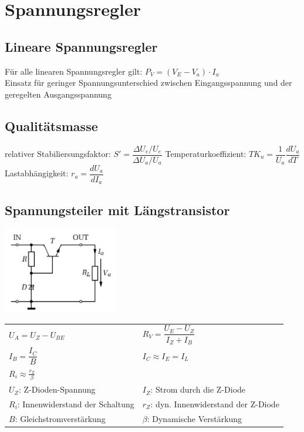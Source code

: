 \section{Spannungsregler}

	\subsection{Lineare Spannungsregler} 
		Für alle linearen Spannungsregler gilt: $ P_{V}=(V_{E}-V_{a}) \cdot I_{a} $\\
		Einsatz für geringer Spannungsunterschied zwischen Eingangsspannung und der
		geregelten Ausgangsspannung \\
	\subsection{Qualitätsmasse}
		relativer Stabiliersungsfaktor: $S' = \dfrac{\Delta U_e/U_e}{\Delta U_a/U_a}$\newline
		Temperaturkoeffizient: $TK_u = \dfrac{1}{U_a}\dfrac{dU_a}{dT}$\\
		Lastabhängigkeit: $r_a = \dfrac{dU_a}{dI_a}$
\subsection{Spannungsteiler mit Längstransistor}
 	\begin{minipage}{200pt}
		\includegraphics[width = 5cm]{./images/spgregler/01_laengstransistor} 
 	\end{minipage}
	\begin{minipage}{300pt}
	\begin{tabular}{p{120pt}p{170pt}}
	$U_{A}=U_{Z}-U_{BE}$ &
	$R_{V}=\dfrac{U_{E}-U_{Z}}{I_{Z}+I_{B}}$\\
	$I_{B}=\dfrac{I_{C}}{B}$&
	$I_{C} \approx I_E = I_L $\\
	$R_{i}\approx\frac{r_{Z}}{\beta} $&
	\\
	\hline
	$U_{Z}$: Z-Dioden-Spannung&
	$I_{Z}$: Strom durch die Z-Diode\\
	$R_{i}$: Innenwiderstand der Schaltung &
	$r_{Z}$: dyn. Innenwiderstand der Z-Diode\\
	$B$: Gleichstromverstärkung &
	$\beta$: Dynamische Verstärkung \\
	\end{tabular}
	\end{minipage}\\
